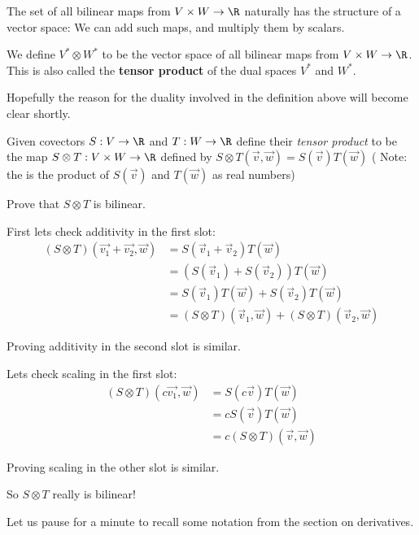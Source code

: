 \documentclass{ximera}
\begin{document}
	The set of all bilinear maps from $V \times W \to \R$ naturally has the structure of a vector space:  We can add such maps, and multiply them by scalars.
	\begin{definition}
		We define $V^* \otimes W^*$ to be the vector space of all bilinear maps from $V \times W \to \R$.  This is also called the \textbf{tensor product} of the dual spaces
		$V^*$ and $W^*$.
	\end{definition}
	
		Hopefully the reason for the duality involved in the definition above will become clear shortly.
				
		Given covectors $S : V \to \R$ and $T:W \to \R$ define their \textit{tensor product} to be the map 
		$S \otimes T: V \times W \to \R$ defined by $S \otimes T(\vec{v},\vec{w}) = S(\vec{v}) T(\vec{w})$
		( Note: the is the product of $S(\vec{v})$ and $T(\vec{w})$  as real numbers)
		
		Prove that $S \otimes T$ is bilinear.
		
\begin{free-response}
	First lets check additivity in the first slot:
		\begin{align*}
			(S \otimes T)(\vec{v_1}+\vec{v_2},\vec{w}) &= S(\vec{v}_1+\vec{v}_2)T(\vec{w})\\
				&= \left(S(\vec{v}_1) +S(\vec{v}_2)\right)T(\vec{w})\\
				&=S(\vec{v}_1)T(\vec{w})+S(\vec{v}_2)T(\vec{w})\\
				&=(S\otimes T)(\vec{v}_1,\vec{w})+(S\otimes T)(\vec{v}_2,\vec{w})
		\end{align*}
		
		Proving additivity in the second slot is similar.
		
		Lets check scaling in the first slot:
		\begin{align*}
			(S \otimes T)(c\vec{v_1},\vec{w}) &= S(c\vec{v})T(\vec{w})\\
				&= cS(\vec{v})T(\vec{w})\\
				&=c(S\otimes T)(\vec{v},\vec{w})
		\end{align*}
		
		Proving scaling in the other slot is similar.
		
		So $S \otimes T$ really is bilinear!
		
\end{free-response}	

	Let us pause for a minute to recall some notation from the section on derivatives.
	
\end{document}
